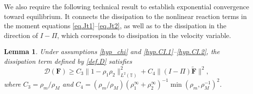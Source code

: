 \documentclass[reqno]{amsart}
\newtheorem{Lemma}{Lemma}
\newcommand{\T}{\mathbb{T}}
\newcommand{\Ft}{{\widetilde{F}}}
\newcommand{\Ftbf}{\mathbf{\Ft}}
\newcommand{\Fbf}{\mathbf{F}}
\numberwithin{equation}{section}
\begin{document}
We also require the following technical result to establish exponential convergence toward equilibrium. It connects the dissipation to the nonlinear reaction terms in the moment equations \eqref{eq.Jt1}--\eqref{eq.Jt2}, as well as to the dissipation in the direction of $I-\Pi$, which corresponds to dissipation in the velocity variable.

\begin{Lemma}\label{lem_estimD}
Under assumptions \eqref{hyp_chi} and \eqref{hyp.CI.1}--\eqref{hyp.CI.2}, the dissipation term defined by \eqref{def.D} satisfies
\begin{equation}\label{estim.D}
    \mathcal{D}(\Fbf)\geq C_3\|1-\rho_1\rho_2\|_{L^2(\T)}^2+C_4\|(I-\Pi)\Ftbf\|^2,
\end{equation}
where $C_3=\rho_m/\rho_M$ and $C_4=(\rho_m/\rho_M)(\rho_1^\infty+\rho_2^\infty)^{-1}\min(\rho_m,\rho_M^{-1})^2$.
\end{Lemma}
\end{document}
